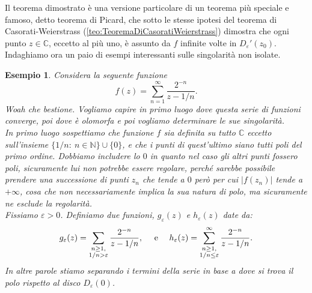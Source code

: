 \documentclass[11pt]{book}
\theoremstyle{Definizione}
\theoremstyle{TeoremaProposizioneLemmaCorollarioCongettura}
\theoremstyle{OsservazioneNotaEsempio}
\newtheorem{myes}{Esempio}[section]
\newcommand{\R}{\mathbb{R}}
\newcommand{\N}{\mathbb{N}}
\newcommand{\C}{\mathbb{C}}
\newcommand{\Disc}[3][]{D^{#1}_{{#2}}({#3})}
\newcommand{\DiscPunt}[2]{D_{#1}'({#2})}
\renewcommand{\i}{\textup{i}}
\begin{document}
\noindent
Il teorema dimostrato è una versione particolare di un teorema più speciale e famoso, detto teorema di Picard, che sotto le stesse ipotesi del teorema di Casorati-Weierstrass  (\ref{teo:TeoremaDiCasoratiWeierstrass}) dimostra che ogni punto $z\in \C$, eccetto al più uno, è assunto da $f$ infinite volte in $\DiscPunt{\varepsilon}{z_0}$.\\
\indent
Indaghiamo ora un paio di esempi interessanti sulle singolarità non isolate.
\begin{myes}\label{es:EsempioSingolaritàNonIsolateSuC}
Considera la seguente funzione
$$
f(z) = \sum_{n = 1}^\infty \frac{2^{-n}}{z-1/n}.
$$
Woah che bestione. Vogliamo capire in primo luogo dove questa serie di funzioni converge, poi dove è olomorfa e poi vogliamo determinare le sue singolarità.\\
In primo luogo sospettiamo che funzione $f$ sia definita su tutto $\C$ eccetto sull'insieme $\{1/n:\ n\in \N\}\cup \{0\}$, e che i punti di quest'ultimo siano tutti poli del primo ordine. Dobbiamo includere lo $0$ in quanto nel caso gli altri punti fossero poli, sicuramente lui non potrebbe essere regolare, perché sarebbe possibile prendere una successione di punti $z_n$ che tende a $0$ però per cui $|f(z_n)|$ tende a $+\infty$, cosa che non necessariamente implica la sua natura di polo, ma sicuramente ne esclude la regolarità.\\
Fissiamo $\varepsilon > 0$. Definiamo due funzioni, $g_\varepsilon(z)$ e $h_\varepsilon(z)$ date da:
$$
g_\varepsilon(z) = \sum_{\substack{n\geq 1,\\ 1/n > \varepsilon}} \frac{2^{-n}}{z-1/n},\quad \textup{ e }\quad h_\varepsilon(z) = \sum_{\substack{n \geq 1,\\ 1/n\leq \varepsilon}}^{\infty} \frac{2^{-n}}{z-1/n}.
$$
In altre parole stiamo separando i termini della serie in base a dove si trova il polo rispetto al disco $\Disc{\varepsilon}{0}$.
\begin{center}
\end{center}
\end{myes}
\end{document}
